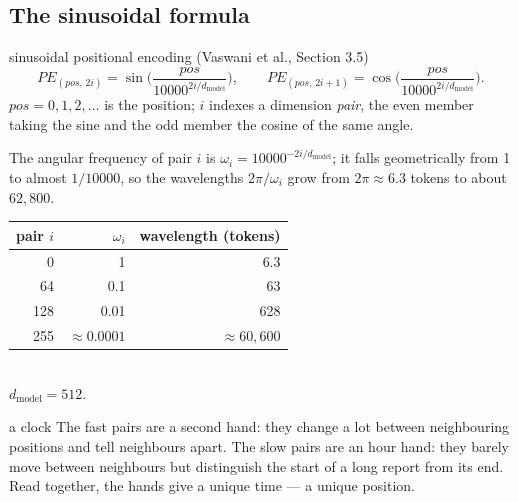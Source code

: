 \documentclass[11pt]{article}
\begin{document}
\subsection{The sinusoidal formula}
\begin{definition}{sinusoidal positional encoding (Vaswani et al., Section 3.5)}
\[PE_{(pos,\,2i)}=\sin\!\Big(\frac{pos}{10000^{2i/d_{\text{model}}}}\Big),\qquad PE_{(pos,\,2i+1)}=\cos\!\Big(\frac{pos}{10000^{2i/d_{\text{model}}}}\Big).\]
$pos=0,1,2,\dots$ is the position; $i$ indexes a dimension \emph{pair}, the even member taking the sine and the odd member the cosine of the same angle.
\end{definition}
The angular frequency of pair $i$ is $\omega_i=10000^{-2i/d_{\text{model}}}$; it falls geometrically from 1 to almost $1/10000$, so the wavelengths $2\pi/\omega_i$ grow from $2\pi\approx6.3$ tokens to about $62{,}800$.
\begin{center}\small\renewcommand{\arraystretch}{1.15}
\begin{tabular}{rrr}\toprule
\textbf{pair $i$} & $\omega_i$ & \textbf{wavelength (tokens)}\\\midrule
0 & 1 & 6.3\\
64 & 0.1 & 63\\
128 & 0.01 & 628\\
255 & $\approx0.0001$ & $\approx60{,}600$\\\bottomrule
\end{tabular}\\[2pt]{\small\color{GreyN}$d_{\text{model}}=512$.}\end{center}
\begin{intuition}{a clock}
The fast pairs are a second hand: they change a lot between neighbouring positions and tell neighbours apart. The slow pairs are an hour hand: they barely move between neighbours but distinguish the start of a long report from its end. Read together, the hands give a unique time --- a unique position.
\end{intuition}
\end{document}
